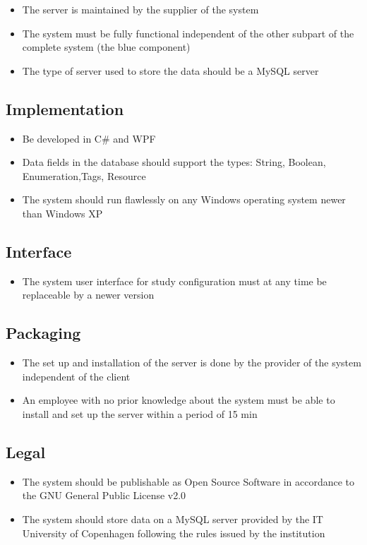 \begin{itemize}
\item The server is maintained by the supplier of the system
\item The system must be fully functional independent of the other subpart of the complete system (the blue component)
\item The type of server used to store the data should be a MySQL server
\end{itemize}

\subsection{Implementation}

\begin{itemize}
\item Be developed in C\# and WPF
\item Data fields in the database should support the types: String, Boolean, Enumeration,Tags, Resource
\item The system should run flawlessly on any Windows operating system newer than Windows XP
\end{itemize}

\subsection{Interface}

\begin{itemize}
\item The system user interface for study configuration must at any time be replaceable by a newer version
\end{itemize}

\subsection{Packaging}

\begin{itemize}
\item The set up and installation of the server is done by the provider of the system independent of the client
\item An employee with no prior knowledge about the system must be able to install and set up the server within a period of 15 min
\end{itemize}

\subsection{Legal}

\begin{itemize}
\item The system should be publishable as Open Source Software in accordance to the GNU General Public License v2.0
\item The system should store data on a MySQL server provided by the IT University of Copenhagen following the rules issued by the institution
\end{itemize}


